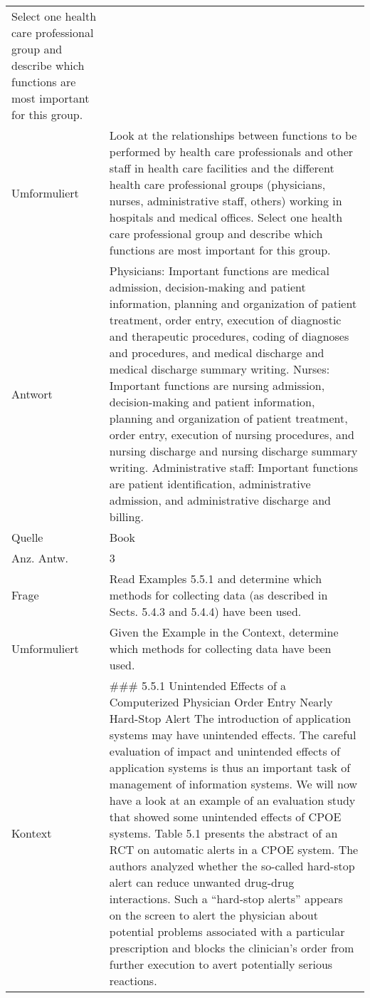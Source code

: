 \begin{landscape}
\begin{longtable}{p{3cm}p{}}
    Select one health care professional group and describe which functions are most important for this group.\\
    Umformuliert & Look at the relationships between functions to be performed by health care professionals and other staff in health care facilities and the different health care professional groups (physicians, nurses, administrative staff, others) working in hospitals and medical offices.
    Select one health care professional group and describe which functions are most important for this group.\\
    Antwort & Physicians: Important functions are medical admission, decision-making and patient information, planning and organization of patient treatment, order entry, execution of diagnostic and therapeutic procedures, coding of diagnoses and procedures, and medical discharge and medical discharge summary writing.
    Nurses: Important functions are nursing admission, decision-making and patient information, planning and organization of patient treatment, order entry, execution of nursing procedures, and nursing discharge and nursing discharge summary writing.
    Administrative staff: Important functions are patient identification, administrative admission, and administrative discharge and billing.\\
    Quelle & Book \\
    Anz. Antw. & 3 \\
    \midrule
    Frage & Read Examples 5.5.1 and determine which methods for collecting data (as described in Sects. 5.4.3 and 5.4.4) have been used.\\
    Umformuliert & Given the Example in the Context, determine which methods for collecting data have been used.\\
    Kontext & \#\#\# 5.5.1 Unintended Effects of a Computerized Physician Order Entry Nearly Hard-Stop Alert
    The introduction of application systems may have unintended effects.
    The careful evaluation of impact and unintended effects of application systems is thus an important task of management of information systems.
    We will now have a look at an example of an evaluation study that showed some unintended effects of CPOE systems.
    Table 5.1 presents the abstract of an RCT on automatic alerts in a CPOE system.
    The authors analyzed whether the so-called hard-stop alert can reduce unwanted drug-drug interactions.
    Such a ``hard-stop alerts'' appears on the screen to alert the physician about potential problems associated with a particular prescription and blocks the clinician's order from further execution to avert potentially serious reactions.


\end{longtable}
\end{landscape}

